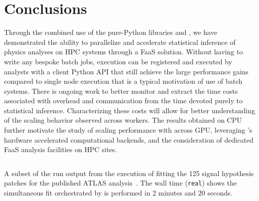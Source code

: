 \section{Conclusions}\label{sec:conclusions}

Through the combined use of the pure-Python libraries \funcX{} and \pyhf{}, we have demonstrated the ability to parallelize and accelerate statistical inference of physics analyses on HPC systems through a FaaS solution.
Without having to write any bespoke batch jobs, execution can be registered and executed by analysts with a client Python API that still achieve the large performance gains compared to single node execution that is a typical motivation of use of batch systems.
There is ongoing work to better monitor and extract the time costs associated with overhead and communication from the time devoted purely to statistical inference.
Characterizing these costs will allow for better understanding of the scaling behavior observed across workers.
The results obtained on CPU further motivate the study of scaling performance with \funcX{} across GPU, leveraging \pyhf{}'s hardware accelerated computational backends, and the consideration of dedicated FaaS analysis facilities on HPC sites.

\clearpage
\begin{listing}
 \inputminted{text}{src/code/funcX_demo_output.txt}
 \caption{A subset of the run output from the execution of fitting the 125 signal hypothesis patches for the published ATLAS analysis~\cite{SUSY-2019-08}.
 The wall time (\texttt{real}) shows the simultaneous fit orchestrated by \funcX{} is performed in 2 minutes and 20 seconds.}
 \label{lst:funcX_demo_output}
\end{listing}
